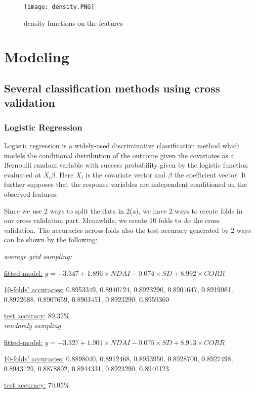 \documentclass[12pt]{extarticle}
\begin{document}
\begin{figure}[htb]
	\centering
	\texttt{[image: density.PNG]}
	\caption{density functions on the features}\label{fig 2}
\end{figure}



\section{Modeling}
\subsection{Several classification methods using cross validation}
\subsubsection{ Logistic Regression}
Logistic regression is a widely-used discriminative classification method which models the conditional distribution of the outcome given the covariates as a Bernoulli random variable with success probability given by the logistic function evaluated at $X_i\beta$. Here $X_i$ is the covariate vector and $\beta$ the coefficient vector. It further supposes that the response variables are independent conditioned on the observed features. 

Since we use 2 ways to split the data in 2(a), we have 2 ways to create folds in our cross validation part. 
Meanwhile, we create 10 folds to do the cross validation. The accuracies across folds also the test accuracy generated by 2 ways can be shown by the following:

\cdot \emph{average grid sampling:}

\underline{fitted-model:}
$y=-3.347+1.896\times NDAI-0.074\times SD+8.992\times CORR$

\underline{10-folds’ accuracies:}
0.8953349, 0.8940724, 0.8923290, 0.8901647, 0.8919081, 0.8922688, 0.8907659, 0.8903451, 0.8923290, 0.8959360

\underline{test accuracy:}  $89.32\%$\\

\cdot \emph{randomly sampling}

\underline{fitted-model:}
$y=-3.327 + 1.901\times NDAI - 0.075\times SD +  8.913\times CORR$

\underline{10-folds’ accuracies:}
0.8898040, 0.8912468, 0.8953950, 0.8928700, 0.8927498, 0.8943129, 0.8878802, 0.8944331, 0.8923290,
0.8940123

\underline{test accuracy:}  $ 70.05\%$
\end{document}
